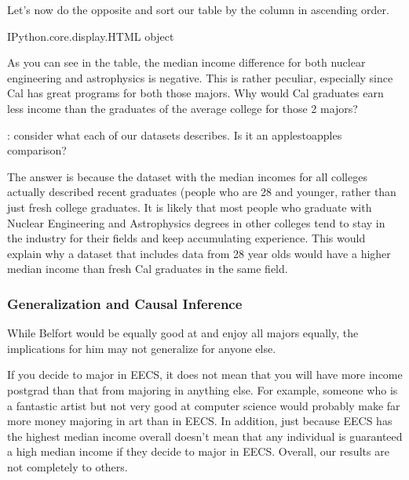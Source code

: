 \documentclass[letterpaper,10pt,english]{jupyterBook}
\begin{document}
\sphinxAtStartPar
Let’s now do the opposite and sort our table by the  column in ascending order.

\begin{sphinxVerbatim}[commandchars=\\\{\}]
\end{sphinxVerbatim}

\begin{sphinxVerbatim}[commandchars=\\\{\}]
\PYGZlt{}IPython.core.display.HTML object\PYGZgt{}
\end{sphinxVerbatim}

\sphinxAtStartPar
As you can see in the table, the median income difference for both nuclear engineering and astrophysics is negative.
This is rather peculiar, especially since Cal has great programs for both those majors.
Why would Cal graduates earn less income than the graduates of the average college for those 2 majors?

\sphinxAtStartPar
{}: consider what each of our datasets describes. Is it an apples\sphinxhyphen{}to\sphinxhyphen{}apples comparison?

\sphinxAtStartPar
The answer is because the dataset with the median incomes for all colleges actually described recent graduates (people who are 28 and younger, rather than just fresh college graduates.
It is likely that most people who graduate with Nuclear Engineering and Astrophysics degrees in other colleges tend to stay in the industry for their fields and keep accumulating experience. This would explain why a dataset that includes data from 28 year olds would have a higher median income than fresh Cal graduates in the same field.


\subsubsection{Generalization and Causal Inference}
\label{\detokenize{content/00-intro/index:generalization-and-causal-inference}}
\sphinxAtStartPar
While Belfort would be equally good at and enjoy all majors equally, the implications for him may not generalize for anyone else.

\sphinxAtStartPar
If you decide to major in EECS, it does not mean that you will have more income post\sphinxhyphen{}grad than that from majoring in anything else. For example, someone who is a fantastic artist but not very good at computer science would probably make far more money majoring in art than in EECS. In addition, just because EECS has the highest median income overall doesn’t mean that any individual is guaranteed a high median income if they decide to major in EECS. Overall, our results are not completely  to others.
\end{document}
